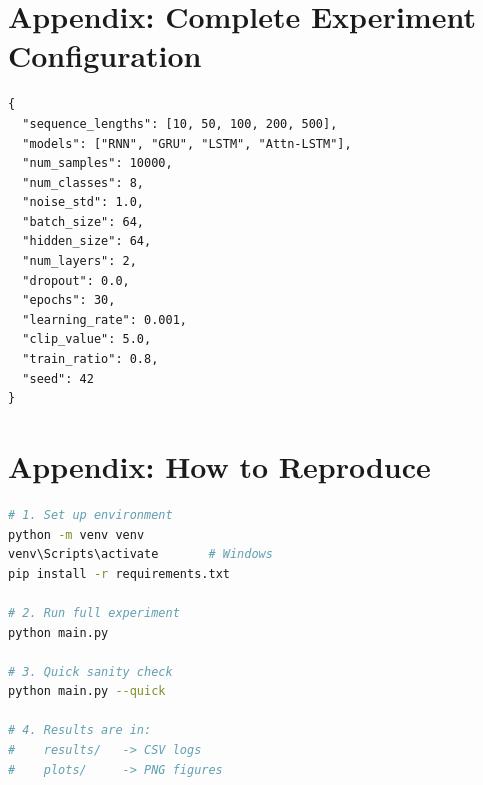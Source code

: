 \documentclass[12pt, a4paper]{article}
\begin{document}
\newpage
\appendix
\section{Appendix: Complete Experiment Configuration}

\begin{lstlisting}[language={}, basicstyle=\ttfamily\small, frame=single, caption={Experiment configuration (JSON).}]
{
  "sequence_lengths": [10, 50, 100, 200, 500],
  "models": ["RNN", "GRU", "LSTM", "Attn-LSTM"],
  "num_samples": 10000,
  "num_classes": 8,
  "noise_std": 1.0,
  "batch_size": 64,
  "hidden_size": 64,
  "num_layers": 2,
  "dropout": 0.0,
  "epochs": 30,
  "learning_rate": 0.001,
  "clip_value": 5.0,
  "train_ratio": 0.8,
  "seed": 42
}
\end{lstlisting}

\section{Appendix: How to Reproduce}

\begin{lstlisting}[language=bash, basicstyle=\ttfamily\small, frame=single, caption={Commands to reproduce all results.}]
# 1. Set up environment
python -m venv venv
venv\Scripts\activate       # Windows
pip install -r requirements.txt

# 2. Run full experiment
python main.py

# 3. Quick sanity check
python main.py --quick

# 4. Results are in:
#    results/   -> CSV logs
#    plots/     -> PNG figures
\end{lstlisting}
\end{document}
